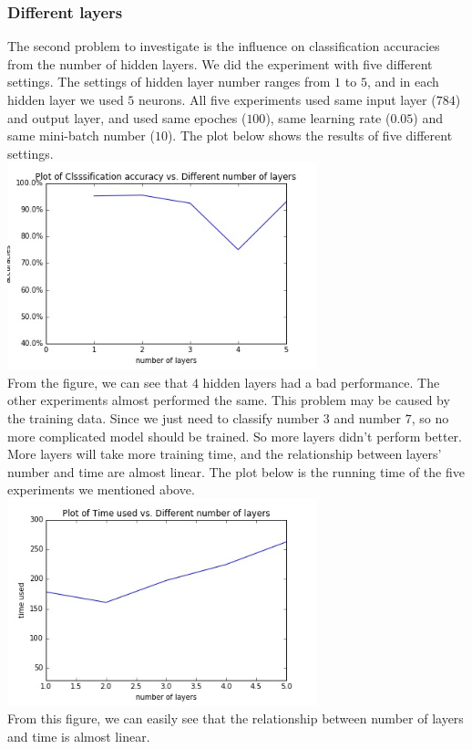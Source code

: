 \documentclass[12pt,a4paper]{article}
\begin{document}
\subsubsection{Different layers}
The second problem to investigate is the influence on classification accuracies from the number of hidden layers. We did the experiment with five different settings. The settings of hidden layer number ranges from $1$ to $5$, and in each hidden layer we used $5$ neurons. All five experiments used same input layer ($784$) and output layer, and used same epoches ($100$), same learning rate ($0.05$) and same mini-batch number ($10$). The plot below shows the results of five different settings.\\
\includegraphics[width=90mm,scale=1]{p103.jpg}\\
From the figure, we can see that $4$ hidden layers had a bad performance. The other experiments almost performed the same. This problem may be caused by the training data. Since we just need to classify number $3$ and number $7$, so no more complicated model should be trained. So more layers didn't perform better.\\
More layers will take more training time, and the relationship between layers' number and time are almost linear. The plot below is the running time of the five experiments we mentioned above.\\
\includegraphics[width=90mm,scale=1]{p104.jpg}\\
From this figure, we can easily see that the relationship between number of layers and time is almost linear.
\end{document}
